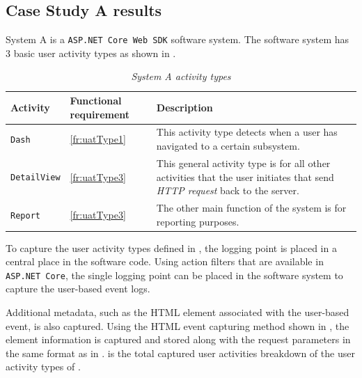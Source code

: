 \subsection{Case Study A results}\label{sec:ch3_csA}
System A is a \texttt{ASP.NET Core Web SDK} software system. The software system has 3 basic user activity types as shown in .

\begin{table}[!htb]
	\centering
	\caption[System A activity types]{\textit{System A activity types}}
	\label{tbl:ch3_systemAActivityTypes}
	\begin{tabularx}{\textwidth}{|X|l|X|}
		\hline \textbf{Activity} & \textbf{Functional requirement} & \textbf{Description} \\
		\hline \texttt{Dash} & \ref{fr:uatType1} & \RaggedRight This activity type detects when a user has navigated to a certain subsystem. \\ 
		\hline \texttt{DetailView} & \ref{fr:uatType3} & \RaggedRight This general activity type is for all other activities that the user initiates that send \textit{HTTP request} back to the server.  \\
		\hline \texttt{Report} & \ref{fr:uatType3} & \RaggedRight The other main function of the system is for reporting purposes. \\ 
		\hline
	\end{tabularx}
\end{table}

To capture the user activity types defined in , the logging point is placed in a central place in the software code. Using action filters that are available in \texttt{ASP.NET Core}, the single logging point can be placed in the software system to capture the user-based event logs.\par Additional metadata, such as the HTML element associated with the user-based event, is also captured. Using the HTML event capturing method shown in , the element information is captured and stored along with the request parameters in the same format as in .  is the total captured user activities breakdown of the user activity types of .

